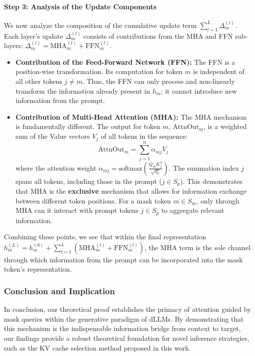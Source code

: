 \paragraph{Step 3: Analysis of the Update Components}
We now analyze the composition of the cumulative update term $\sum_{l=1}^{L} \Delta_m^{(l)}$. Each layer's update $\Delta_m^{(l)}$ consists of contributions from the MHA and FFN sub-layers: $\Delta_m^{(l)} = \text{MHA}_m^{(l)} + \text{FFN}_m^{(l)}$.
\begin{itemize}
    \item \textbf{Contribution of the Feed-Forward Network (FFN):} The FFN is a position-wise transformation. Its computation for token $m$ is independent of all other tokens $j \neq m$. Thus, the FFN can only process and non-linearly transform the information already present in $h_m$; it cannot introduce new information from the prompt.

    \item \textbf{Contribution of Multi-Head Attention (MHA):} The MHA mechanism is fundamentally different. The output for token $m$, $\text{AttnOut}_m$, is a weighted sum of the Value vectors $V_j$ of all tokens in the sequence:
    $$ \text{AttnOut}_m = \sum_{j=1}^{n} \alpha_{mj} V_j $$
    where the attention weight $\alpha_{mj} = \text{softmax}\left(\frac{Q_m K_j^T}{\sqrt{d_k}}\right)$. The summation index $j$ spans all tokens, including those in the prompt ($j \in S_p$). This demonstrates that MHA is the \textbf{exclusive} mechanism that allows for information exchange between different token positions. For a mask token $m \in S_m$, only through MHA can it interact with prompt tokens $j \in S_p$ to aggregate relevant information.
\end{itemize}
Combining these points, we see that within the final representation $h_m^{(L)} = h_m^{(0)} + \sum_{l=1}^{L} (\text{MHA}_m^{(l)} + \text{FFN}_m^{(l)})$, the MHA term is the sole channel through which information from the prompt can be incorporated into the mask token's representation.

\subsubsection{Conclusion and Implication}

In conclusion, our theoretical proof establishes the primacy of attention guided by mask queries within the generative paradigm of dLLMs. By demonstrating that this mechanism is the indispensable information bridge from context to target, our findings provide a robust theoretical foundation for novel inference strategies, such as the KV cache selection method proposed in this work.


